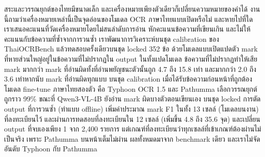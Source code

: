 สระและวรรณยุกต์ของไทยมีขนาดเล็ก และเครื่องหมายเพียงตัวเดียวก็เปลี่ยนความหมายของคำได้ งานนี้ถามว่าเครื่องหมายเหล่านี้เป็นจุดอ่อนของโมเดล OCR ภาษาไทยแบบเปิดหรือไม่ และหายไปที่ใด เราเสนอคะแนนที่วัดเครื่องหมายโดยไม่สนลำดับการอ่าน หักคะแนนข้อความที่เขียนเกิน และไม่ให้คะแนนกับข้อความที่ซ้ำจากการวนซ้ำ เราพัฒนาการวิเคราะห์บนชุด calibration ของ ThaiOCRBench แล้วทดสอบครั้งเดียวบนชุด locked 352 ข้อ ด้วยโมเดลแบบเปิดแปดตัว mark ที่หายส่วนใหญ่อยู่ในข้อความที่ไม่ปรากฏใน output ในทั้งแปดโมเดล ข้อความที่ไม่ปรากฏทำให้เสีย mark มากกว่า mark ที่อ่านผิดทั้งที่อ่านพยัญชนะตัวนั้นถูก 4.7 ถึง 15.8 เท่า และมากกว่า 2.0 ถึง 3.6 เท่าหากนับ mark ที่อ่านผิดทุกแบบ บนชุด calibration เมื่อได้รับข้อความก่อนหน้าที่ถูกต้อง โมเดล fine-tune ภาษาไทยสองตัว คือ Typhoon OCR 1.5 และ Pathumma เลือกวรรณยุกต์ถูกราว 99\% ขณะที่ Qwen3-VL-4B ยังอ่าน mark ผิดบางตัวตอนเขียนเอง บนชุด locked การตัด output ที่การวนซ้ำ (ทำแบบ offline) เพิ่มค่าประมาณ mark F1 ในทั้ง 13 เซลล์ (โมเดลบนงาน) ที่ลงทะเบียนไว้ และผ่านการทดสอบที่ลงทะเบียนใน 12 เซลล์ (เพิ่มขึ้น 4.8 ถึง 35.6 จุด) และเปลี่ยน output ที่จบเองเพียง 1 จาก 2,400 รายการ แต่เกณฑ์ที่ลงทะเบียนว่าทุกเซลล์ที่เข้าเกณฑ์ต้องผ่านไม่เป็นจริง เพราะ Pathumma บนหน้าเต็มไม่ผ่าน ผลทั้งหมดมาจาก benchmark เดียว และเราไม่จัดอันดับ Typhoon กับ Pathumma
